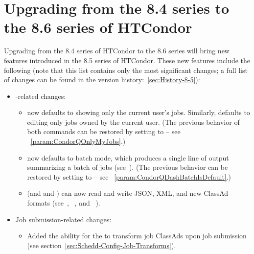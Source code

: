 \section{\label{sec:to-8.6}Upgrading from the 8.4 series to the 8.6 series of HTCondor}

Upgrading from the 8.4 series of HTCondor to the 8.6 series
will bring new features introduced in the 8.5 series of HTCondor.
These new features include the following (note that this list contains
only the most significant changes; a full list of changes can be
found in the version history:~\ref{sec:History-8-5}):

\begin{itemize}

\item {}-related changes:
  \begin{itemize}

  \item {} now defaults to showing only the current user's jobs.
  Similarly,  defaults to editing only jobs owned by the
  current user.  
  (The previous behavior of both commands can be restored by setting
   to  --
  see ~\ref{param:CondorQOnlyMyJobs}.)

  \item {} now defaults to batch mode, which produces a single
  line of output summarizing a batch of jobs (see~\pageref{batches-of-jobs}).
  (The previous behavior can be restored by setting
   to  --
  see ~\ref{param:CondorQDashBatchIsDefault}.)

  \item {} (and  and ) can now
  read and write JSON, XML, and new ClassAd formats
  (see~\pageref{man-condor-q}, ~\pageref{man-condor-history},
  and ~\pageref{man-condor-status}).

  \end{itemize}

\item Job submission-related changes:
  \begin{itemize}

   \item Added the ability for the  to transform
   job ClassAds upon job submission
   (see section~\ref{sec:Schedd-Config-Job-Transforms}).


\end{itemize}
\end{itemize}
